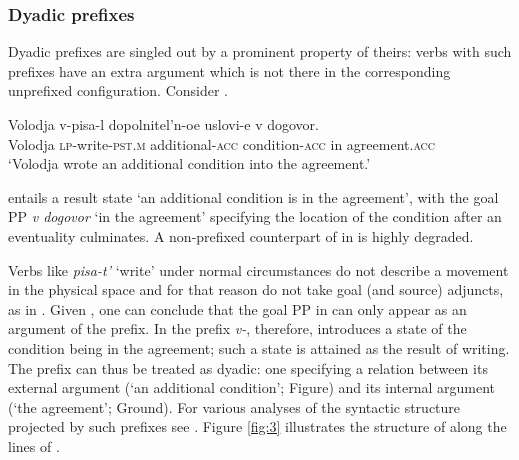 \documentclass[output=paper,colorlinks,citecolor=brown]{langscibook}
\begin{document}
\subsubsection{Dyadic prefixes}\label{sec:3.3.5}
\hypertarget{RefHeadingToc164647632}{}
Dyadic prefixes are singled out by a prominent property of theirs: verbs with such prefixes have an extra argument which is not there in the corresponding unprefixed configuration. Consider .

\ea\label{ex:tatevosov:107}
\gll Volodja  v-pisa-l  dopolnitel’n-oe  uslovi-e v  dogovor.\\
Volodja  \textsc{lp}-write-\textsc{pst.m}  additional-\textsc{acc}  condition-\textsc{acc} in  agreement.\textsc{acc}\\
\glt ‘Volodja wrote an additional condition into the agreement.’
\z

\noindent {} entails a result state ‘an additional condition is in the agreement’, with the goal PP \textit{v dogovor} ‘in the agreement’ specifying the location of the condition after an eventuality culminates. A non-prefixed counterpart of  in  is highly degraded.

\z

\noindent Verbs like \textit{pisa-t’} ‘write’ under normal circumstances do not describe a movement in the physical space and for that reason do not take goal (and source) adjuncts, as in . Given , one can conclude that the goal PP in  can only appear as an argument of the prefix. In  the prefix \textit{v-}, therefore, introduces a state of the condition being in the agreement; such a state is attained as the result of writing. The prefix can thus be treated as dyadic: one specifying a relation between its external argument (‘an additional condition’; Figure)  and its internal argument (‘the agreement’; Ground). For various analyses of the syntactic structure projected by such prefixes see \citet{Ramchand2004,Svenonius2004,Svenonius2008,Romanova2007,Biskup2019}. Figure \ref{fig:3} illustrates the structure of  along the lines of \citet{Svenonius2004}.
\end{document}
